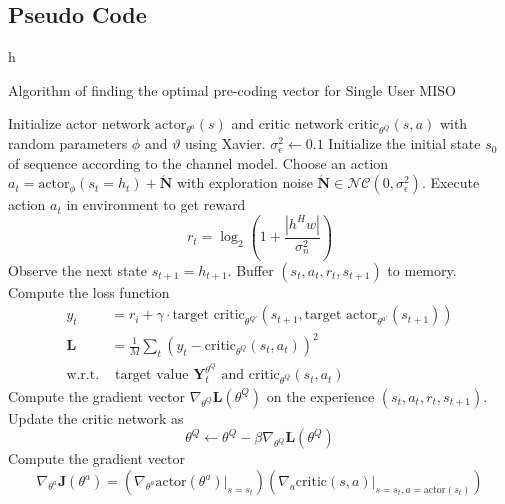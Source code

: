 \subsection{Pseudo Code}
\vspace{-20pt}
\begin{algorithm}{h}
    \caption{Algorithm of finding the optimal pre-coding vector for Single User MISO}
    \label{alg:single-user}
    \begin{algorithmic}
        \State Initialize actor network $\text{actor}_{\theta^a}(s)$ and critic network $\text{critic}_{\theta^Q}(s,a)$ with random parameters $\phi$ and $\vartheta$ using Xavier.
        \State $\sigma^2_\epsilon \gets 0.1$
            \State Initialize the initial state $s_0$ of sequence according to the channel model.
                \State Choose an action $a_t = \text{actor}_\phi(s_t = h_t) + \acute{\mathbf{N}}$ with exploration noise $\acute{\mathbf{N}} \in \mathcal{N} \mathcal{C}  \left( 0, \sigma^2_\epsilon \right)$.
                \State Execute action $a_t$ in environment to get reward \[ r_t = \log_2 \left( 1 + \frac{ |h^Hw| }{\sigma^2_n} \right) \]
                \State Observe the next state $s_{t+1} = h_{t+1}$.
                \State Buffer $(s_t, a_t, r_t, s_{t+1})$ to memory.
                \State Compute the loss function 
                \begin{equation}
                    \begin{aligned}
                        y_t &= r_i + \gamma \cdot \text{target critic}_{\theta^{Q'}} \left( s_{t+1} , \text{target actor}_{\theta^{a'}}(s_{t+1}) \right) \\
                        \mathbf{L} &= \frac{1}{M} \sum_{t} \left( y_t - \text{critic}_{\theta^Q}(s_t, a_t) \right)^2 \\
                        \text{w.r.t.} & \text{ target value } \mathbf{Y}^{\theta^Q}_t \text{ and } \text{critic}_{\theta^Q}(s_t, a_t)
                    \end{aligned}
                \end{equation}
                \State Compute the gradient vector $\nabla_{\theta^Q} \mathbf{L}(\theta^Q)$ on the experience $(s_t, a_t, r_t, s_{t+1})$.
                \State Update the critic network as \[ \theta^Q \gets \theta^Q - \beta \nabla_{\theta^Q} \mathbf{L}(\theta^Q) \]
                \State Compute the gradient vector \[ \nabla_{\theta^a} \mathbf{J}(\theta^a) = \left( \nabla_{\theta^a} \text{actor}(\theta^a) |_{s=s_t} \right) \left( \nabla_{a} \text{critic}(s,a)|_{s=s_t , a = \text{actor}(s_t)} \right) \]

\end{algorithmic}
\end{algorithm}
